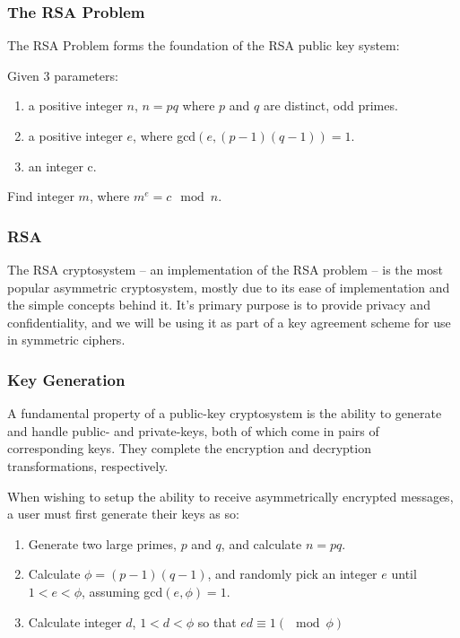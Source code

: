     \subsubsection{The RSA Problem}
    
    The RSA Problem forms the foundation of the RSA public key system:
    
    \begin{mathdef}
      Given 3 parameters:
      \begin{enumerate}
        \item a positive integer $n$, $n=pq$ where $p$ and $q$ are distinct, odd primes.
        \item a positive integer $e$, where gcd$(e, (p-1)(q-1)) = 1$.
        \item an integer c.
      \end{enumerate} 
      Find integer $m$, where $m^e = c \mod{n}$.
    \end{mathdef}
    
    \subsubsection{RSA}
    
    The RSA cryptosystem -- an implementation of the RSA problem -- is the most popular asymmetric cryptosystem, mostly due to its ease of implementation and the simple concepts behind it. It's primary purpose is to provide privacy and confidentiality, and we will be using it as part of a key agreement scheme for use in symmetric ciphers.
     
    \subsubsection{Key Generation}
    \label{subsubsec:rsa_keygen}
    
    A fundamental property of a public-key cryptosystem is the ability to generate and handle public- and private-keys, both of which come in pairs of corresponding keys. They complete the encryption and decryption transformations, respectively. 
    
    When wishing to setup the ability to receive asymmetrically encrypted messages, a user must first generate their keys as so:
    
    \begin{enumerate}
      \item Generate two large primes, $p$ and $q$, and calculate $n=pq$.
      \item Calculate $\phi = (p-1)(q-1)$, and randomly pick an integer $e$ until $1 < e < \phi$, assuming gcd$(e,\phi)=1$.
      \item Calculate integer $d$, $1 < d < \phi$ so that $ed \equiv 1 (\mod{\phi})$
    \end{enumerate}
    
